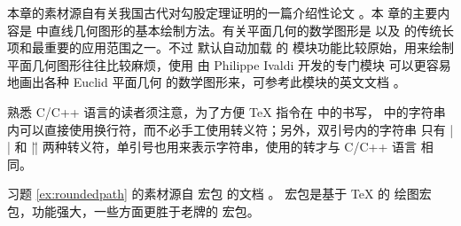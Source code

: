 本章的素材源自有关我国古代对勾股定理证明的一篇介绍性论文 \cite{quanjing}。本
章的主要内容是 \Asy{} 中直线几何图形的基本绘制方法。有关平面几何的数学图形是
\Asy{} 以及 \MP{} 的传统长项和最重要的应用范围之一。不过 \Asy{} 默认自动加载
的  模块功能比较原始，用来绘制平面几何图形往往比较麻烦，使用
由 Philippe Ivaldi 开发的专门模块 
可以更容易地画出各种 Euclid 平面几何
的数学图形来，可参考此模块的英文文档 \cite{geometry}。

熟悉 C/C++ 语言的读者须注意，为了方便 \TeX{} 指令在 \Asy{} 中的书写，\Asy{} 
中的字符串内可以直接使用换行符，而不必手工使用转义符；另外，双引号内的字符串
只有 |\\| 和 |\"| 两种转义符，单引号也用来表示字符串，使用的转才与 C/C++ 语言
相同。

习题 \ref{ex:roundedpath} 的素材源自  宏包
的文档 \cite{pgfman}。 宏包是基于 \TeX{} 的
绘图宏包，功能强大，一些方面更胜于老牌的  宏包。

\endinput


